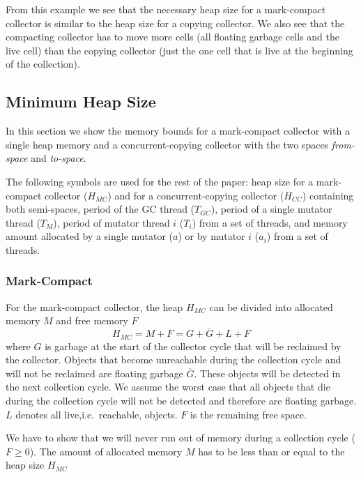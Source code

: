 From this example we see that the necessary heap size for a
mark-compact collector is similar to the heap size for a copying
collector. We also see that the compacting collector has to move
more cells (all floating garbage cells and the live cell) than the
copying collector (just the one cell that is live at the beginning
of the collection).


\subsection{Minimum Heap Size} \label{sec:min:heap}

In this section we show the memory bounds for a mark-compact
collector with a single heap memory and a concurrent-copying
collector with the two spaces \emph{from-space} and \emph{to-space}.

The following symbols are used for the rest of the paper: heap size
for a mark-compact collector ($H_{MC}$) and for a concurrent-copying
collector ($H_{CC}$) containing both semi-spaces, period of the GC
thread ($T_{GC}$), period of a single mutator thread ($T_M$), period
of mutator thread $i$ ($T_i$) from a set of threads, and memory
amount allocated by a single mutator ($a$) or by mutator $i$ ($a_i$)
from a set of threads.

\subsubsection{Mark-Compact} \label{sec:gcsched:mc}

For the mark-compact collector, the heap $H_{MC}$ can be divided into
allocated memory $M$ and free memory $F$
%
\begin{equation}\label{equ:mcheap}
    H_{MC} = M + F = G + \overline{G} + L + F
\end{equation}
%
where $G$ is garbage at the start of the collector cycle that will
be reclaimed by the collector. Objects that become unreachable
during the collection cycle and will not be reclaimed are floating
garbage $\overline{G}$. These objects will be detected in the next
collection cycle. We assume the worst case that all objects that die
during the collection cycle will not be detected and therefore are
floating garbage. $L$ denotes all live,i.e.\  reachable, objects.
$F$ is the remaining free space.

We have to show that we will never run out of memory during a
collection cycle ($F\ge0$). The amount of allocated memory $M$ has to
be less than or equal to the heap size $H_{MC}$


